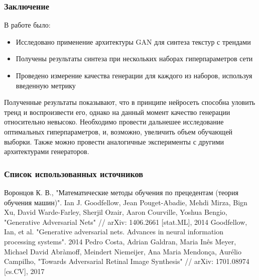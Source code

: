 \documentclass[12pt]{beamer}
\begin{document}
\begin{frame}\frametitle{Заключение}
	В работе было:
	\begin{itemize}
		\item Исследовано применение архитектуры GAN для синтеза текстур с трендами
		\item Получены результаты синтеза при нескольких наборах гиперпараметров сети
		\item Проведено измерение качества генерации для каждого из наборов, используя введенную метрику
	\end{itemize}
	Полученные результаты показывают, что в принципе нейросеть способна уловить тренд и воспроизвести его, однако на данный момент качество генерации относительно невысоко. Необходимо провести дальнешее исследование оптимальных гиперпараметров, и, возможно, увеличить объем обучающей выборки. Также можно провести аналогичные эксперименты с другими архитектурами генераторов.
\end{frame}

\begin{frame}\frametitle{Список использованных источников}
	\begin{thebibliography}{99}
		  Воронцов К. В., "Математические методы обучения по прецедентам (теория обучения машин)".
		 Ian J. Goodfellow, Jean Pouget-Abadie, Mehdi Mirza, Bign Xu, David Warde-Farley, Sherjil Ozair, Aaron Courville, Yoshua Bengio, "Generative Adversarial Nets" // arXiv: 1406.2661 [stat.ML], 2014
		 Goodfellow, Ian, et al. "Generative adversarial nets. Advances in neural information processing systems". 2014
		 Pedro Costa, Adrian Galdran, Maria Inês Meyer, Michael David Abràmoff, Meindert Niemeijer, Ana Maria Mendonça, Aurélio Campilho, "Towards Adversarial Retinal Image Synthesis" // arXiv: 1701.08974 [cs.CV], 2017	
	\end{thebibliography}
\end{frame}
\end{document}
